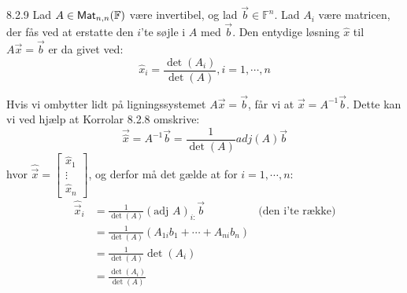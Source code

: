 \begin{korollar}{8.2.9}
	Lad $A \in \textsf{Mat}_{n,n}(\mathbb{F})$ være invertibel, og lad $\vec{b} \in 
	\mathbb{F}^n$.
	Lad $A_i$ være matricen, der fås ved at erstatte den $i$'te søjle i $A$ med
	$\vec{b}$. Den entydige løsning $\hat{x}$ til $A\vec{x} = \vec{b}$ er da 
	givet ved:
	\[
		\hat{x}_i = \frac{\det(A_i)}{\det(A)}, i = 1, \cdots, n
	\]
\end{korollar}

\begin{bevis}
	Hvis vi ombytter lidt på ligningssystemet $A\vec{x} = \vec{b}$, får vi at
	$\vec{x} = A^{-1}\vec{b}$. Dette kan vi ved hjælp at Korrolar 8.2.8 
	omskrive:
	\[
		\vec{\hat{x}} = A^{-1}\vec{b} = \frac{1}{\det(A)}adj(A)\vec{b}
	\]
	hvor $\hat{\vec{x}} = \begin{bmatrix}\hat{x}_1\\ \vdots \\ \hat{x}_n 
	\end{bmatrix}$, og derfor må det gælde at for $i = 1, \cdots, n$:
	\begin{align*}
		\hat{\vec{x}}_i	&= \frac{1}{\det(A)}(\text{adj }A)_{i:}\vec{b} 
							& \text{(den i'te række)}\\
						&= \frac{1}{\det(A)}(A_{1i}b_1 + \cdots + A_{ni}b_n)\\
						&= \frac{1}{\det(A)}\det(A_i)\\
						&= \frac{\det(A_i)}{\det(A)}
	\end{align*}
\end{bevis}
